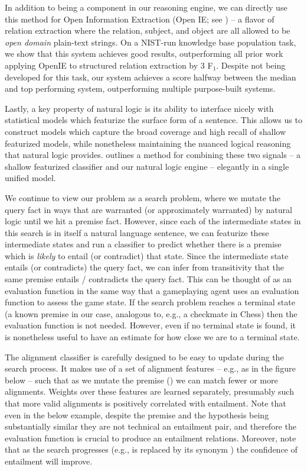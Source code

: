 In addition to being a component in our reasoning engine,
  we can directly use this method for Open Information Extraction 
  (Open IE; see ) -- a flavor of relation 
  extraction where the relation, subject, and 
  object are all allowed to be \textit{open domain} plain-text strings.
On a NIST-run knowledge base population task, we show that this system 
  achieves good results, outperforming all prior work applying OpenIE
  to structured relation extraction by 3 F$_1$.
Despite not being developed for this 
  task, our system achieves a score halfway between the median and top 
  performing system, outperforming multiple purpose-built systems.


%
%
Lastly, a key property of natural logic is its ability to interface nicely with 
  statistical models which featurize the surface form of a sentence.
This allows us to construct models which capture the broad coverage and high recall
  of shallow featurized models, while nonetheless maintaining the nuanced logical
  reasoning that natural logic provides.
 outlines a method for combining these two signals -- a shallow
  featurized classifier and our natural logic engine -- elegantly in
  a single unified model.

We continue to view our problem as a search problem, where we mutate the query fact
  in ways that are warranted (or approximately warranted) by natural logic until we
  hit a premise fact.
However, since each of the intermediate states in this search is in itself a natural
  language sentence, we can featurize these intermediate states and run a classifier
  to predict whether there is a premise which is \textit{likely} to entail (or contradict) that state.
Since the intermediate state entails (or contradicts) the query fact, we can infer
  from transitivity that the same premise entails / contradicts the query fact.
This can be thought of as an evaluation function in the same way that a gameplaying agent
  uses an evaluation function to assess the game state.
If the search problem reaches a terminal state (a known premise in our case, analogous to, e.g., a checkmate
  in Chess) then the evaluation function is not needed.
However, even if no terminal state is found, it is nonetheless useful to have an estimate for how close we
  are to a terminal state.

The alignment classifier is carefully designed to be easy to update during the search
  process.
It makes use of a set of alignment features -- e.g., as in the figure below -- such that
  as we mutate the premise () we can match
  fewer or more alignments.
Weights over these features are learned separately, presumably such that more valid alignments
  is positively correlated with entailment.
Note that even in the below example, despite the premise and the hypothesis being substantially
  similar they are not technical an entailment pair, and therefore the evaluation function is crucial
  to produce an entailment relations.
Moreover, note that as the search progresses (e.g.,  is replaced by its synonym )
  the confidence of entailment will improve.

